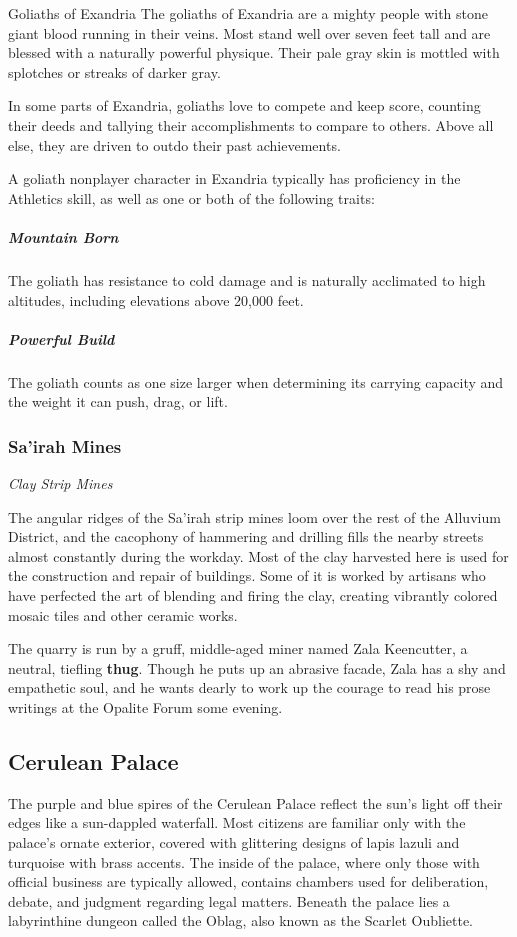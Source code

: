 \documentclass[10pt,a4paper,twoside,fancy,bg=print,twocolumn,openany,nodeprecatedcode]{dndbook}
\begin{document}
\begin{DndSidebar}[float=!b]{Goliaths of Exandria}
The goliaths of Exandria are a mighty people with stone giant blood running in their veins. Most stand well over seven feet tall and are blessed with a naturally powerful physique. Their pale gray skin is mottled with splotches or streaks of darker gray.



In some parts of Exandria, goliaths love to compete and keep score, counting their deeds and tallying their accomplishments to compare to others. Above all else, they are driven to outdo their past achievements.



A goliath nonplayer character in Exandria typically has proficiency in the Athletics skill, as well as one or both of the following traits:



\subparagraph{Mountain Born}
The goliath has resistance to cold damage and is naturally acclimated to high altitudes, including elevations above 20,000 feet.



\subparagraph{Powerful Build}
The goliath counts as one size larger when determining its carrying capacity and the weight it can push, drag, or lift.



\end{DndSidebar}

\subsubsection{Sa'irah Mines}
\textit{Clay Strip Mines}

The angular ridges of the Sa'irah strip mines loom over the rest of the Alluvium District, and the cacophony of hammering and drilling fills the nearby streets almost constantly during the workday. Most of the clay harvested here is used for the construction and repair of buildings. Some of it is worked by artisans who have perfected the art of blending and firing the clay, creating vibrantly colored mosaic tiles and other ceramic works.

The quarry is run by a gruff, middle-aged miner named Zala Keencutter, a neutral, tiefling \textbf{thug}. Though he puts up an abrasive facade, Zala has a shy and empathetic soul, and he wants dearly to work up the courage to read his prose writings at the Opalite Forum some evening.

\subsection{Cerulean Palace}
The purple and blue spires of the Cerulean Palace reflect the sun's light off their edges like a sun-dappled waterfall. Most citizens are familiar only with the palace's ornate exterior, covered with glittering designs of lapis lazuli and turquoise with brass accents. The inside of the palace, where only those with official business are typically allowed, contains chambers used for deliberation, debate, and judgment regarding legal matters. Beneath the palace lies a labyrinthine dungeon called the Oblag, also known as the Scarlet Oubliette.
\end{document}
